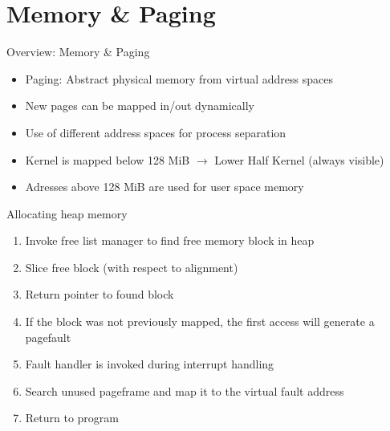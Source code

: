 \section{Memory \& Paging}

\begin{frame}{Overview: Memory \& Paging}
	\begin{itemize}
		\setlength\itemsep{1em}
		\item Paging: Abstract physical memory from virtual address spaces
		\item New pages can be mapped in/out dynamically
		\item Use of different address spaces for process separation
		\item Kernel is mapped below 128 MiB $\rightarrow$ Lower Half Kernel (always visible)
		\item Adresses above 128 MiB are used for user space memory
	\end{itemize}	
\end{frame}


\begin{frame}{Allocating heap memory}
	\begin{enumerate}
		\setlength\itemsep{1em}
		\item Invoke free list manager to find free memory block in heap
		\item Slice free block (with respect to alignment)
		\item Return pointer to found block
		\item If the block was not previously mapped, the first access will generate a pagefault
		\item Fault handler is invoked during interrupt handling
		\item Search unused pageframe and map it to the virtual fault address
		\item Return to program
	\end{enumerate}
\end{frame}